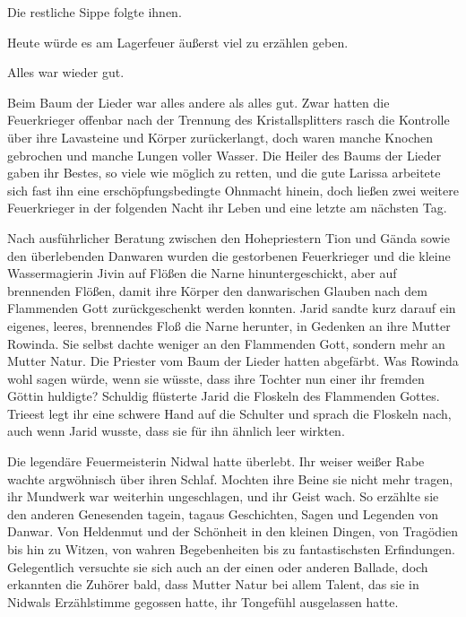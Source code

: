 Die restliche Sippe folgte ihnen.

Heute würde es am Lagerfeuer äußerst viel zu erzählen geben.

Alles war wieder gut.



\trennzeichen



Beim Baum der Lieder war alles andere als alles gut. Zwar hatten die Feuerkrieger offenbar nach der Trennung des Kristallsplitters rasch die Kontrolle über ihre Lavasteine und Körper zurückerlangt, doch waren manche Knochen gebrochen und manche Lungen voller Wasser. Die Heiler des Baums der Lieder gaben ihr Bestes, so viele wie möglich zu retten, und die gute Larissa arbeitete sich fast ihn eine erschöpfungsbedingte Ohnmacht hinein, doch ließen zwei weitere Feuerkrieger in der folgenden Nacht ihr Leben und eine letzte am nächsten Tag.

Nach ausführlicher Beratung zwischen den Hohepriestern Tion und Gända sowie den überlebenden Danwaren wurden die gestorbenen Feuerkrieger und die kleine Wassermagierin Jivin auf Flößen die Narne hinuntergeschickt, aber auf brennenden Flößen, damit ihre Körper den danwarischen Glauben nach dem Flammenden Gott zurückgeschenkt werden konnten. Jarid sandte kurz darauf ein eigenes, leeres, brennendes Floß die Narne herunter, in Gedenken an ihre Mutter Rowinda. Sie selbst dachte weniger an den Flammenden Gott, sondern mehr an Mutter Natur. Die Priester vom Baum der Lieder hatten abgefärbt. Was Rowinda wohl sagen würde, wenn sie wüsste, dass ihre Tochter nun einer ihr fremden Göttin huldigte? Schuldig flüsterte Jarid die Floskeln des Flammenden Gottes. Trieest legt ihr eine schwere Hand auf die Schulter und sprach die Floskeln nach, auch wenn Jarid wusste, dass sie für ihn ähnlich leer wirkten.

Die legendäre Feuermeisterin Nidwal hatte überlebt. Ihr weiser weißer Rabe wachte argwöhnisch über ihren Schlaf. Mochten ihre Beine sie nicht mehr tragen, ihr Mundwerk war weiterhin ungeschlagen, und ihr Geist wach. So erzählte sie den anderen Genesenden tagein, tagaus Geschichten, Sagen und Legenden von Danwar. Von Heldenmut und der Schönheit in den kleinen Dingen, von Tragödien bis hin zu Witzen, von wahren Begebenheiten bis zu fantastischsten Erfindungen. Gelegentlich versuchte sie sich auch an der einen oder anderen Ballade, doch erkannten die Zuhörer bald, dass Mutter Natur bei allem Talent, das sie in Nidwals Erzählstimme gegossen hatte, ihr Tongefühl ausgelassen hatte.

